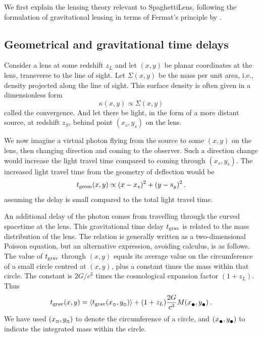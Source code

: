\documentclass[usenatbib]{mn2e}
\newcommand{\spl}{SpaghettiLens\xspace}
\newcommand{\tgeom}{t_{\rm geom}}
\newcommand{\tgrav}{t_{\rm grav}}
\newcommand{\subcirc}{{\lower.33ex\hbox{$\circ$}}}
\newcommand{\subbullet}{{\lower.33ex\hbox{$\bullet$}}}
\begin{document}
We first explain the lensing theory relevant to \spl, following the
formulation of gravitational lensing in terms of Fermat's principle by
\cite{1986ApJ...310..568B}.


\subsection{Geometrical and gravitational time delays} 

Consider a lens at some redshift $z_L$ and let $(x,y)$ be planar
coordinates at the lens, transverse to the line of sight.  Let
$\Sigma(x,y)$ be the mass per unit area, i.e., density projected along
the line of sight.  This surface density is often given in a
dimensionless form
\begin{equation} \label{eq:kappa}
\kappa(x,y) \propto \Sigma(x,y)
\end{equation}
called the convergence.  And let there be light, in the form of a more
distant source, at redshift $z_S$, behind point $(x_s,y_s)$ on the
lens.

We now imagine a virtual photon flying from the source to some $(x,y)$
on the lens, then changing direction and coming to the observer.  Such
a direction change would increase the light travel time compared to
coming through $(x_s,y_s)$.  The increased light travel time from the
geometry of deflection would be
\begin{equation} \label{eq:tgeom}
\tgeom(x,y) \propto (x-x_s)^2 + (y-s_y)^2 \,.
\end{equation}
assuming the delay is small compared to the total light travel time.

An additional delay of the photon comes from travelling through the
curved spacetime at the lens.  This gravitational time delay $\tgrav$
is related to the mass distribution of the lens.  The relation is
generally written as a two-dimensional Poisson equation, but an
alternative expression, avoiding calculus, is as follows.  The value
of $\tgrav$ through $(x,y)$ equals its average value on the
circumference of a small circle centred at $(x,y)$, plus a constant
times the mass within that circle.  The constant is $2G/c^3$ times the
cosmological expansion factor $(1+z_L)$. Thus
\begin{equation} \label{eq:tgrav}
\tgrav(x,y) = \left\langle \tgrav(x_\subcirc,y_\subcirc) \right\rangle
              + (1+z_L) \frac{2G}{c^3} M(x_\subbullet,y_\subbullet) \,.
\end{equation}
We have used $(x_\subcirc,y_\subcirc)$ to denote the circumference of
a circle, and $(x_\subbullet,y_\subbullet)$ to indicate the integrated
mass within the circle.
\end{document}
